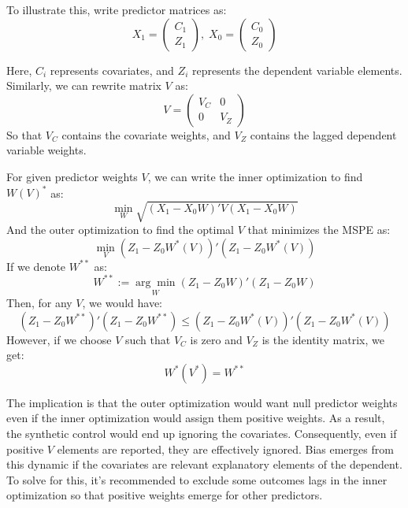\documentclass[12pt,a4paper,draft]{article}
\begin{document}
To illustrate this, write predictor matrices as:
\begin{equation}
    X_1 = \left( \begin{matrix} C_1 \\ Z_1 \end{matrix} \right), \;
    X_0 = \left( \begin{matrix} C_0 \\ Z_0 \end{matrix} \right)
\end{equation}

Here, $C_i$ represents covariates, and $Z_i$ represents the dependent variable elements. 
Similarly, we can rewrite matrix $V$ as:
\begin{equation}
    V = \begin{pmatrix}
        V_C & 0 \\
        0 & V_Z
    \end{pmatrix}
\end{equation}
So that $V_C$ contains the covariate weights, and $V_Z$ contains the lagged dependent 
variable weights.

For given predictor weights $V$, we can write the inner optimization to find $W(V)^*$ as:
\begin{equation}
    \min_{W} \sqrt{(X_1-X_0 W)' V (X_1-X_0 W)}
\end{equation}
And the outer optimization to find the optimal $V$ that minimizes the MSPE as:
\begin{equation}
    \min_V (Z_1 - Z_0  W^*(V))' (Z_1 - Z_0 W^*(V))
\end{equation}
If we denote $W^{**}$ as:
\begin{equation}
    W^{**} := \underset{W}{\arg\min}  (Z_1 -Z_0 W)' (Z_1-Z_0 W) 
\end{equation}
Then, for any $V$, we would have:
\begin{equation}
    (Z_1-Z_0 W^{**})' (Z_1-Z_0 W^{**}) \le (Z_1 - Z_0  W^*(V))' (Z_1 - Z_0 W^*(V))
\end{equation}
However, if we choose $V$ such that $V_C$ is zero and $V_Z$ is the identity matrix, we get:
\begin{equation}
    W^* (V^*) = W^{**}
\end{equation}

The implication is that the outer optimization would want null predictor weights 
even if the inner optimization would assign them positive weights. 
As a result, the synthetic control would end up ignoring the covariates.
Consequently, even if positive $V$ elements are reported, they are effectively ignored. 
Bias emerges from this dynamic if the covariates are relevant explanatory elements of the dependent. 
To solve for this, it's recommended to exclude some outcomes lags in the inner 
optimization so that positive weights emerge for other predictors.
\end{document}
